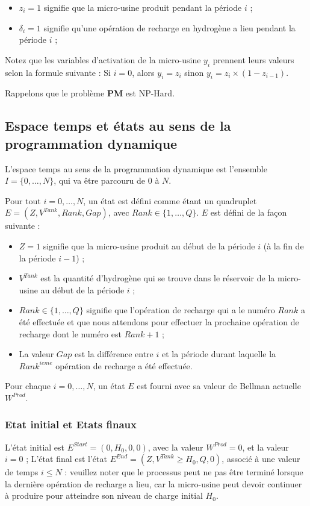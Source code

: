 \begin{itemize}[label=$\square$]
	\item  $z_i = 1$ signifie que la micro-usine produit pendant la période $i$ ; 
	\item  $\delta_i = 1$ signifie qu'une opération de recharge en hydrogène a lieu pendant la période $i$ ; 
	

\end{itemize}
	Notez que les variables d'activation de la micro-usine $y_i$ prennent leurs valeurs selon la formule suivante : Si $i = 0$, alors $y_i = z_i$ sinon $y_i = z_i\times (1-z_{i-1})$.

Rappelons que le problème \textbf{PM} est NP-Hard.



\subsection{Espace temps et états au sens de la programmation dynamique}
L'espace temps au sens de la programmation dynamique est l'ensemble $I = \{0, \dots, N\}$, qui va être parcouru de 0 à $N$.

Pour tout $i = 0, \dots, N$, un état est défini comme étant un quadruplet $E = (Z, V^{Tank}, Rank, Gap)$, avec $Rank \in \{1, \dots, Q\}$. $E $ est défini de la façon suivante :
\begin{itemize}[label=$\square$]
	\item $Z = 1$ signifie que la micro-usine produit au début de la période $i$ (à la fin de la période $i-1$) ;
	\item $V^{Tank}$ est la quantité d'hydrogène qui se trouve dans le réservoir de la micro-usine au début de la période $i$ ;
	\item $Rank \in \{1, \dots, Q\}$ signifie que l'opération de recharge qui a le numéro $Rank$ a été effectuée et que nous attendons pour effectuer la prochaine opération de recharge dont le numéro est $Rank + 1$ ; 
	\item La valeur $Gap$ est la différence entre $i$ et la période durant laquelle la $Rank^{ieme}$ opération de recharge a été effectuée. 
\end{itemize}
Pour chaque $i = 0, \dots,N$, un état $E$ est fourni avec sa valeur de Bellman actuelle $W^{Prod}$. 
\subsubsection{Etat initial et Etats finaux}
 L'état initial est $E^{Start} = (0, H_0, 0, 0)$, avec la valeur $W^{Prod} =0$, et la valeur $i= 0$ ; 
L'état final est l'état $E^{End} = (Z, V^{Tank} \geq H_0, Q, 0)$, associé à une valeur de temps $i \leq N$ : veuillez noter que le processus peut ne pas être terminé lorsque la dernière opération de recharge a lieu, car la micro-usine peut devoir continuer à produire pour atteindre son niveau de charge initial $H_0$.


